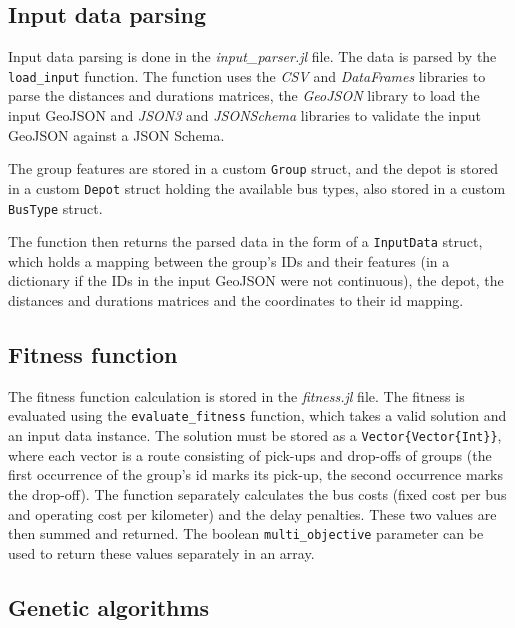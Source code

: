 \subsection{Input data parsing}

Input data parsing is done in the \textit{input\_parser.jl} file. The data is parsed by the \texttt{load\_input} function. The function uses the \textit{CSV} and \textit{DataFrames} libraries to parse the distances and durations matrices, the \textit{GeoJSON} library to load the input GeoJSON and \textit{JSON3} and \textit{JSONSchema} libraries to validate the input GeoJSON against a JSON Schema.

The group features are stored in a custom \texttt{Group} struct, and the depot is stored in a custom \texttt{Depot} struct holding the available bus types, also stored in a custom \texttt{BusType} struct.

The function then returns the parsed data in the form of a \texttt{InputData} struct, which holds a mapping between the group's IDs and their features (in a dictionary if the IDs in the input GeoJSON were not continuous), the depot, the distances and durations matrices and the coordinates to their id mapping.

\subsection{Fitness function}

The fitness function calculation is stored in the \textit{fitness.jl} file. The fitness is evaluated using the \texttt{evaluate\_fitness} function, which takes a valid solution and an input data instance. The solution must be stored as a \texttt{Vector\{Vector\{Int\}\}}, where each vector is a route consisting of pick-ups and drop-offs of groups (the first occurrence of the group's id marks its pick-up, the second occurrence marks the drop-off). The function separately calculates the bus costs (fixed cost per bus and operating cost per kilometer) and the delay penalties. These two values are then summed and returned. The boolean \texttt{multi\_objective} parameter can be used to return these values separately in an array.

\subsection{Genetic algorithms}

